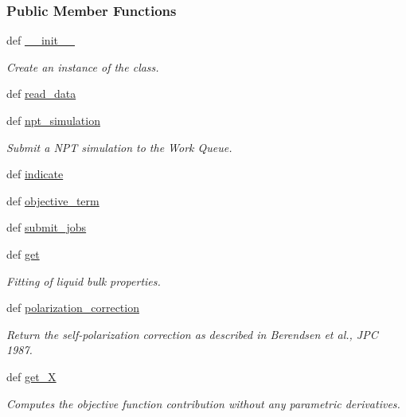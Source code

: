 \subsubsection*{\-Public \-Member \-Functions}
\begin{DoxyCompactItemize}
\item 
def \hyperlink{classforcebalance_1_1liquid_1_1Liquid_a73a35541914580d0d918d34d94065f39}{\-\_\-\-\_\-init\-\_\-\-\_\-}
\begin{DoxyCompactList}\small\item\em \-Create an instance of the class. \end{DoxyCompactList}\item 
def \hyperlink{classforcebalance_1_1liquid_1_1Liquid_a08b698af913d56f780d0587821c922cd}{read\-\_\-data}
\item 
def \hyperlink{classforcebalance_1_1liquid_1_1Liquid_a07a59f9f335693329b789a9c7608fc9f}{npt\-\_\-simulation}
\begin{DoxyCompactList}\small\item\em \-Submit a \-N\-P\-T simulation to the \-Work \-Queue. \end{DoxyCompactList}\item 
def \hyperlink{classforcebalance_1_1liquid_1_1Liquid_ae94ce30dfd0e92fdd6d746e6743be844}{indicate}
\item 
def \hyperlink{classforcebalance_1_1liquid_1_1Liquid_a00c23db61bcb86cc19f79dacdb2bc1f3}{objective\-\_\-term}
\item 
def \hyperlink{classforcebalance_1_1liquid_1_1Liquid_a716e28bb5572b3273036ac753b7e1e1d}{submit\-\_\-jobs}
\item 
def \hyperlink{classforcebalance_1_1liquid_1_1Liquid_a802c4139e5c002fabdeab5de88093880}{get}
\begin{DoxyCompactList}\small\item\em \-Fitting of liquid bulk properties. \end{DoxyCompactList}\item 
def \hyperlink{classforcebalance_1_1liquid_1_1Liquid_a51ea9d9fb4418ec2497fe8e2d8033d41}{polarization\-\_\-correction}
\begin{DoxyCompactList}\small\item\em \-Return the self-\/polarization correction as described in \-Berendsen et al., \-J\-P\-C 1987. \end{DoxyCompactList}\item 
def \hyperlink{classforcebalance_1_1target_1_1Target_a606dd136f195c267c05a2455405e5949}{get\-\_\-\-X}
\begin{DoxyCompactList}\small\item\em \-Computes the objective function contribution without any parametric derivatives. \end{DoxyCompactList}\item 

\end{DoxyCompactItemize}
